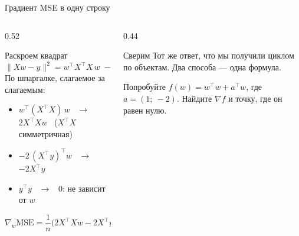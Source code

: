 \begin{frame}[c]{Градиент MSE в одну строку}
  \begin{columns}[T]
    \begin{column}{0.52\textwidth}
      \begin{block}{Раскроем квадрат}
        \small
        \[\lVert Xw - y\rVert^2 = w^\top X^\top X\, w \;-\; 2\,y^\top X w \;+\; y^\top y\]
        По шпаргалке, слагаемое за слагаемым:
        \begin{itemize}
          \item $w^\top (X^\top X)\, w$ \ $\to$ \ $2X^\top X w$ \ {\footnotesize\color{acGray}($X^\top X$ симметричная)}
          \item $-2\,(X^\top y)^\top w$ \ $\to$ \ $-2X^\top y$
          \item $y^\top y$ \ $\to$ \ $0$: не зависит от $w$
        \end{itemize}
        \[\nabla_w \mathrm{MSE} = \frac1n\bigl(2X^\top X w - 2X^\top y\bigr) = \frac2n X^\top(Xw - y)\]
      \end{block}
    \end{column}
    \begin{column}{0.44\textwidth}
      \begin{block}{Сверим}
        \small
        Тот же ответ, что мы получили циклом по объектам. Два способа --- одна формула.
      \end{block}
      \begin{block}{Попробуйте}
        \small
        $f(w) = w^\top w + a^\top w$, где $a = (1;\ -2)$. Найдите $\nabla f$ и точку, где он равен нулю.

        \smallskip
      \end{block}
    \end{column}
  \end{columns}
\end{frame}

